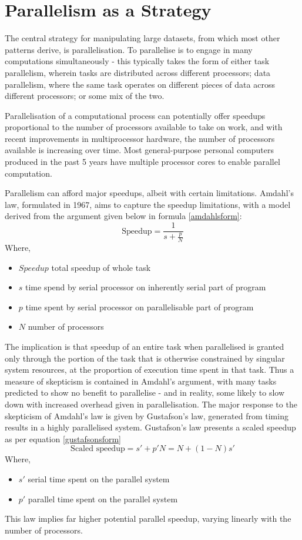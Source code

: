 \documentclass[a4paper,10pt]{article}
\begin{document}
\section{Parallelism as a Strategy}
\label{parallel}
The central strategy for manipulating large datasets, from which most other patterns derive, is parallelisation. To parallelise is to engage in many computations simultaneously - this typically takes the form of either task parallelism, wherein tasks are distributed across different processors; data parallelism, where the same task operates on different pieces of data across different processors; or some mix of the two.

Parallelisation of a computational process can potentially offer speedups proportional to the number of processors available to take on work, and with recent improvements in multiprocessor hardware, the number of processors available is increasing over time.
Most general-purpose personal computers produced in the past 5 years have multiple processor cores to enable parallel computation.

Parallelism can afford major speedups, albeit with certain limitations.
Amdahl's law, formulated in 1967, aims to capture the speedup limitations, with a model derived from the argument given below in formula \ref{amdahlsform}\cite{amdahl1967law}\cite{gustafson1988law}:
\begin{equation}
	\label{amdahlsform}
	\textrm{Speedup} = \frac{1}{s+\frac{p}{N}}
\end{equation}
Where,
\begin{itemize}
	\item \(Speedup\) total speedup of whole task
	\item \(s\) time spend by serial processor on inherently serial part of program
	\item \(p\) time spent by serial processor on parallelisable part of program
	\item \(N\) number of processors
\end{itemize}
The implication is that speedup of an entire task when parallelised is granted only through the portion of the task that is otherwise constrained by singular system resources, at the proportion of execution time spent in that task.
Thus a measure of skepticism is contained in Amdahl's argument, with many tasks predicted to show no benefit to parallelise - and in reality, some likely to slow down with increased overhead given in parallelisation. 
The major response to the skepticism of Amdahl's law is given by Gustafson's law, generated from timing results in a highly parallelised system.
Gustafson's law presents a scaled speedup as per equation \ref{gustafsonsform}
\begin{equation}
	\label{gustafsonsform}
	\textrm{Scaled speedup} = s' + p'N = N + (1-N)s'
\end{equation}
Where,
\begin{itemize}
	\item \(s'\) serial time spent on the parallel system
	\item \(p'\) parallel time spent on the parallel system
\end{itemize}
This law implies far higher potential parallel speedup, varying linearly with the number of processors.
\end{document}

